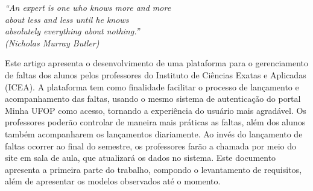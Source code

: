 \documentclass[
  12pt,       %
  openright,      %
  oneside,      %
  a4paper,      %
  english,      %
  french,        %
  spanish,     %
  brazil        %
  ]{abntex2-decsi}
\begin{document}
\begin{epigrafe}
    \vspace*{\fill}
  \begin{flushright}
    \textit{``An expert is one who knows more and more\\
    about less and less until he knows\\
    absolutely everything about nothing.''\\
    (Nicholas Murray Butler)}
  \end{flushright}
\end{epigrafe}


\setlength{\absparsep}{18pt} %
\begin{resumo}


Este artigo apresenta o desenvolvimento de uma plataforma para o gerenciamento de faltas dos alunos pelos professores do Instituto de Ciências Exatas e Aplicadas (ICEA). A plataforma tem como finalidade facilitar o processo de lançamento e acompanhamento das faltas, usando o mesmo sistema de autenticação do portal Minha UFOP como acesso, tornando a experiência do usuário mais agradável. Os professores poderão controlar de maneira mais práticas as faltas, além dos alunos também acompanharem os lançamentos diariamente. Ao invés do lançamento de faltas ocorrer ao final do semestre, os professores farão a chamada por meio do site em sala de aula, que atualizará os dados no sistema. Este documento apresenta a primeira parte do trabalho, compondo o levantamento de requisitos, além de apresentar os modelos observados até o momento.


\end{resumo}
\end{document}
